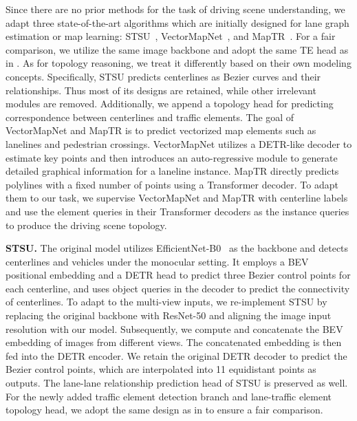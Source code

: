 Since there are no prior methods for the task of driving scene understanding, we adapt three state-of-the-art algorithms which are initially designed for lane graph estimation or map learning: STSU~\cite{can2021stsu}, VectorMapNet~\cite{liu2022vectormapnet}, and MapTR~\cite{liao2023maptr}.
For a fair comparison, we utilize the same image backbone and adopt the same TE head as in \algname. As for topology reasoning, we treat it differently based on their own modeling concepts.
Specifically, STSU predicts centerlines as Bezier curves and their relationships. Thus most of its designs are retained, while other irrelevant modules are removed. Additionally, we append a topology head for predicting correspondence between centerlines and traffic elements.
The goal of VectorMapNet and MapTR is to predict vectorized map elements such as lanelines and pedestrian crossings. VectorMapNet utilizes a DETR-like decoder to estimate key points and then introduces an auto-regressive module to generate detailed graphical information for a laneline instance. MapTR directly predicts polylines with a fixed number of points using a Transformer decoder. 
To adapt them to our task, we supervise VectorMapNet and MapTR with centerline labels and use the element queries in their Transformer decoders as the instance queries to produce the driving scene topology.



\smallskip
\noindent
\textbf{STSU.}
The original model utilizes EfficientNet-B0~\cite{tan2019efficientnet} as the backbone and detects centerlines and vehicles under the monocular setting. 
It employs a BEV positional embedding and a DETR head to predict three Bezier control points for each centerline, and uses object queries in the decoder to predict the connectivity of centerlines.
To adapt to the multi-view inputs, we re-implement STSU by replacing the original backbone with ResNet-50 and aligning the image input resolution with our model. 
Subsequently, we compute and concatenate the BEV embedding of images from different views. 
The concatenated embedding is then fed into the DETR encoder. 
We retain the original DETR decoder to predict the Bezier control points, which are interpolated into 11 equidistant points as outputs. 
The lane-lane relationship prediction head of STSU is preserved as well. 
For the newly added traffic element detection branch and lane-traffic element topology head, we adopt the same design as in \algname to ensure a fair comparison.



